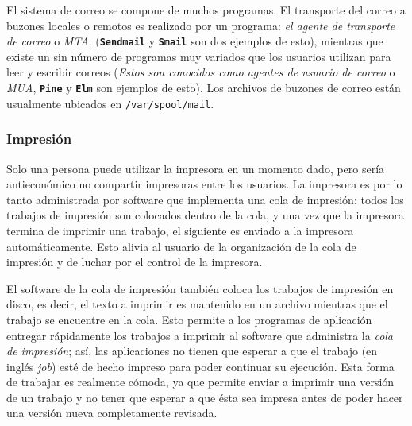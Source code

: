 \documentclass[12pt]{article}
\begin{document}
 El sistema de correo se compone de muchos programas. El transporte del
correo a buzones locales o remotos es realizado por un programa: \textit{el
agente de transporte de correo} o \textit{MTA}.
(\texttt{\textbf{Sendmail}} y \texttt{\textbf{Smail}} son dos ejemplos de
esto), mientras que existe un sin número de programas muy variados que los
usuarios utilizan para leer y escribir correos (\textit{Estos son conocidos
como agentes de usuario de correo }o \textit{MUA},
\texttt{\textbf{Pine}} y \texttt{\textbf{Elm}} son ejemplos de esto). Los
archivos de buzones de correo están usualmente ubicados en
\texttt{/var/spool/mail}.  




\subsubsection{ Impresión}

 Solo una persona puede utilizar la impresora en un momento dado, pero
sería antieconómico no compartir impresoras entre los usuarios. La impresora es
por lo tanto administrada por software que implementa una cola de impresión:
todos los trabajos de impresión son colocados dentro de la cola, y una vez que
la impresora termina de imprimir una trabajo, el siguiente es enviado a la
impresora automáticamente. Esto alivia al usuario de la organización de la cola
de impresión y de luchar por el control de la impresora.  

 El software de la cola de impresión también coloca los trabajos de
impresión en disco, es decir, el texto a imprimir es mantenido en un archivo
mientras que el trabajo se encuentre en la cola. Esto permite a los programas de
aplicación entregar rápidamente los trabajos a imprimir al software que
administra la \textit{cola de impresión}; así, las aplicaciones no
tienen que esperar a que el trabajo (en inglés \textit{job}) esté de hecho impreso para
poder continuar su ejecución. Esta forma de trabajar es realmente cómoda, ya que
permite enviar a imprimir una versión de un trabajo y no tener que esperar a que
ésta sea impresa antes de poder hacer una versión nueva completamente revisada.



\end{document}
